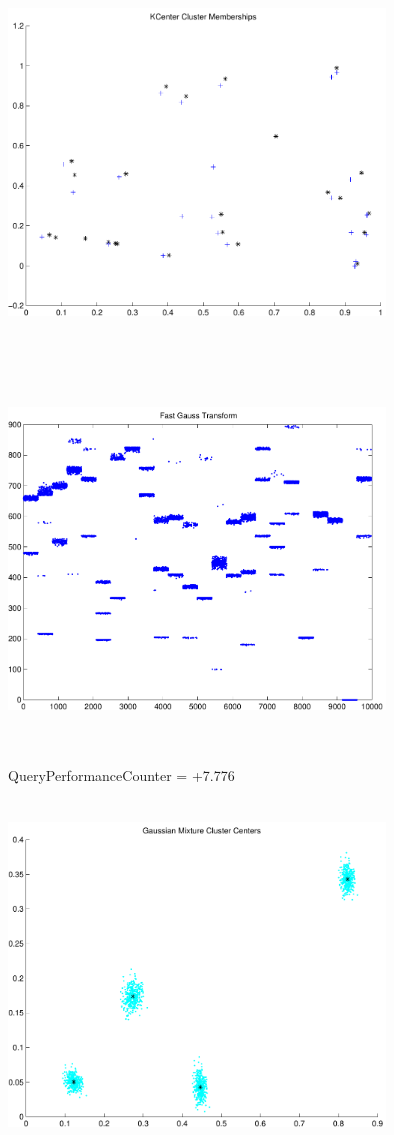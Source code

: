 \documentclass[9pt]{article}
\theoremstyle{plain}
\theoremstyle{definition}
\theoremstyle{remark}
\numberwithin{equation}{section}
\begin{document}
\includegraphics[width=10.0cm,height=10.0cm]{KCenterClusterMemberships_24_Centers.pdf}

\includegraphics[width=10.0cm,height=10.0cm]{FGT24_Centers.pdf}

QueryPerformanceCounter  =  +7.776
\includegraphics[width=10.0cm,height=10.0cm]{GaussianMixture_ClusterCenters4_Centers.pdf}
\end{document}
